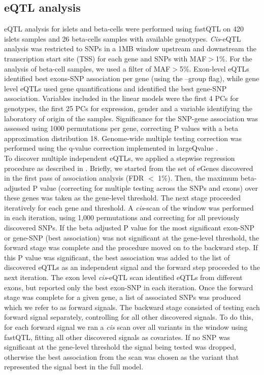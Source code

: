 \subsection{eQTL analysis}
eQTL analysis for islets and beta-cells were performed using fastQTL \cite{ongenFastEfficientQTL2016} on 420 islets samples and 26 beta-cells samples with available genotypes. \textit{Cis}-eQTL analysis was restricted to SNPs in a 1MB window upstream and downstream the transcription start site (TSS) for each gene and SNPs with MAF$>$1\%. For the analysis of beta-cell samples, we used a filter of MAF$>$5\%. Exon-level eQTLs identified best exons-SNP association per gene (using the –group flag), while gene level eQTLs used gene quantifications and identified the best gene-SNP association. Variables included in the linear models were the first 4 PCs for genotypes, the first 25 PCs for expression, gender and a variable identifying the laboratory of origin of the samples. Significance for the SNP-gene association was assessed using 1000 permutations per gene, correcting P values with a beta approximation distribution 18. Genome-wide multiple testing correction was performed using the q-value correction \cite{storeyDirectApproachFalse2002} implemented in largeQvalue \cite{brownLargeQvalueProgramCalculating2015}. \\
    
To discover multiple independent eQTLs, we applied a stepwise regression procedure as described in \cite{brownPredictingCausalVariants2017}. Briefly, we started from the set of eGenes discovered in the first pass of association analysis (FDR $<$ 1\%). Then, the maximum beta-adjusted P value (correcting for multiple testing across the SNPs and exons) over these genes was taken as the gene-level threshold. The next stage proceeded iteratively for each gene and threshold. A \textit{cis}-scan of the window was performed in each iteration, using 1,000 permutations and correcting for all previously discovered SNPs. If the beta adjusted P value for the most significant exon-SNP or gene-SNP (best association) was not significant at the gene-level threshold, the forward stage was complete and the procedure moved on to the backward step. If this P value was significant, the best association was added to the list of discovered eQTLs as an independent signal and the forward step proceeded to the next iteration. The exon level \textit{cis}-eQTL scan identified eQTLs from different exons, but reported only the best exon-SNP in each iteration. Once the forward stage was complete for a given gene, a list of associated SNPs was produced which we refer to as forward signals. The backward stage consisted of testing each forward signal separately, controlling for all other discovered signals. To do this, for each forward signal we ran a \textit{cis} scan over all variants in the window using fastQTL, fitting all other discovered signals as covariates. If no SNP was significant at the gene-level threshold the signal being tested was dropped, otherwise the best association from the scan was chosen as the variant that represented the signal best in the full model.

